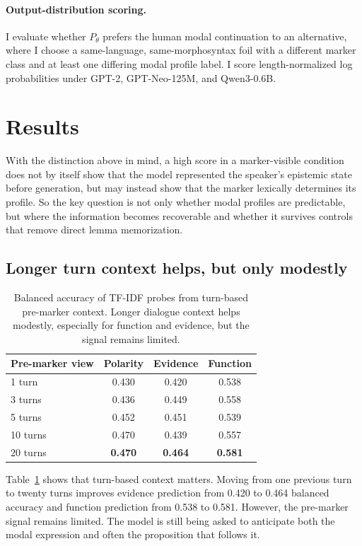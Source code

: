 \documentclass{article}
\begin{document}
\paragraph{Output-distribution scoring.}
I evaluate whether $P_\theta$ prefers the human modal continuation to an alternative, where I choose a same-language, same-morphosyntax foil with a different marker class and at least one differing modal profile label. I score length-normalized log probabilities under GPT-2, GPT-Neo-125M, and Qwen3-0.6B. 

\section{Results}
With the distinction above in mind, a high score in a marker-visible condition does not by itself show that the model represented the speaker's epistemic state before generation, but may instead show that the marker lexically determines its profile. So the key question is not only whether modal profiles are predictable, but where the information becomes recoverable and whether it survives controls that remove direct lemma memorization.

\subsection{Longer turn context helps, but only modestly}

\begin{table}[t]
\centering
\small
\begin{tabular}{lccc}
\toprule
Pre-marker view & Polarity & Evidence & Function \\
\midrule
1 turn & 0.430 & 0.420 & 0.538 \\
3 turns & 0.436 & 0.449 & 0.558 \\
5 turns & 0.452 & 0.451 & 0.539 \\
10 turns & 0.470 & 0.439 & 0.557 \\
20 turns & \textbf{0.470} & \textbf{0.464} & \textbf{0.581} \\
\bottomrule
\end{tabular}
\caption{Balanced accuracy of TF-IDF probes from turn-based pre-marker context. Longer dialogue context helps modestly, especially for function and evidence, but the signal remains limited.}
\label{tab:probe}
\end{table}

Table~\ref{tab:probe} shows that turn-based context matters. Moving from one previous turn to twenty turns improves evidence prediction from 0.420 to 0.464 balanced accuracy and function prediction from 0.538 to 0.581. However, the pre-marker signal remains limited. The model is still being asked to anticipate both the modal expression and often the proposition that follows it.
\end{document}
